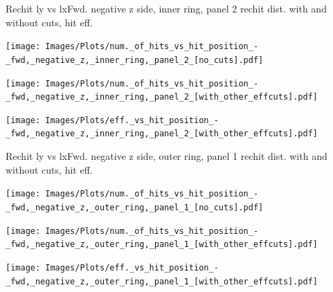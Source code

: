 \documentclass{beamer}
\begin{document}
\begin{frame}{Rechit ly vs lx}{Fwd. negative z side, inner ring, panel 2 rechit dist. with and without cuts, hit eff.}
  \begin{minipage}{0.32\textwidth}
    \centering
    \texttt{[image: Images/Plots/num.\_of\_hits\_vs\_hit\_position\_-\_fwd,\_negative\_z,\_inner\_ring,\_panel\_2\_[no\_cuts].pdf]}
  \end{minipage}%
  \begin{minipage}{0.32\textwidth}
    \centering
    \texttt{[image: Images/Plots/num.\_of\_hits\_vs\_hit\_position\_-\_fwd,\_negative\_z,\_inner\_ring,\_panel\_2\_[with\_other\_effcuts].pdf]}
  \end{minipage}%
  \begin{minipage}{0.32\textwidth}
    \centering
    \texttt{[image: Images/Plots/eff.\_vs\_hit\_position\_-\_fwd,\_negative\_z,\_inner\_ring,\_panel\_2\_[with\_other\_effcuts].pdf]}
  \end{minipage}
\end{frame}

\begin{frame}{Rechit ly vs lx}{Fwd. negative z side, outer ring, panel 1 rechit dist. with and without cuts, hit eff.}
  \begin{minipage}{0.32\textwidth}
    \centering
    \texttt{[image: Images/Plots/num.\_of\_hits\_vs\_hit\_position\_-\_fwd,\_negative\_z,\_outer\_ring,\_panel\_1\_[no\_cuts].pdf]}
  \end{minipage}%
  \begin{minipage}{0.32\textwidth}
    \centering
    \texttt{[image: Images/Plots/num.\_of\_hits\_vs\_hit\_position\_-\_fwd,\_negative\_z,\_outer\_ring,\_panel\_1\_[with\_other\_effcuts].pdf]}
  \end{minipage}%
  \begin{minipage}{0.32\textwidth}
    \centering
    \texttt{[image: Images/Plots/eff.\_vs\_hit\_position\_-\_fwd,\_negative\_z,\_outer\_ring,\_panel\_1\_[with\_other\_effcuts].pdf]}
  \end{minipage}
\end{frame}
\end{document}
